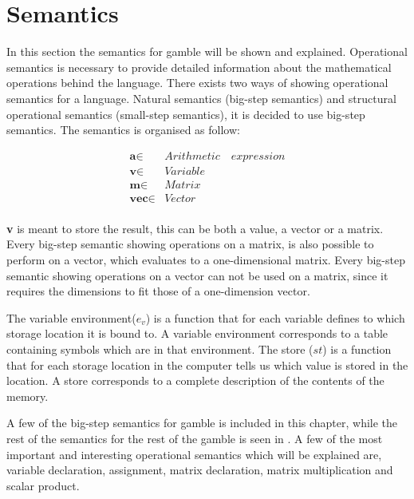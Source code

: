 \chapter{Semantics}
In this section the semantics for \gls{gamble} will be shown and explained.
Operational semantics is necessary to provide detailed information about the mathematical operations behind the language.
There exists two ways of showing operational semantics for a language.
Natural semantics (big-step semantics) and structural operational semantics (small-step semantics), it is decided to use big-step semantics.
The semantics is organised as follow:

\begin{align*}
	\textbf{a} \in  &Arithmetic\quad expression\\
	\textbf{v} \in  &Variable\\
	\textbf{m} \in  &Matrix\\
	\textbf{vec} \in  &Vector\\
\end{align*}

\textbf{v} is meant to store the result, this can be both a value, a vector or a matrix.
Every big-step semantic showing operations on a matrix, is also possible to perform on a vector, which evaluates to a one-dimensional matrix.
Every big-step semantic showing operations on a vector can not be used on a matrix, since it requires the dimensions to fit those of a one-dimension vector.

The variable environment(${ e }_{ v }$) is a function that for each variable defines to which storage location it is bound to. A variable environment corresponds to a table containing symbols which are in that environment.
The store ($st$) is a function that for each storage location in the computer tells us which value is stored in the location. A store corresponds to a complete description of the contents of the memory.\citep{EnvSt_Semantics}

A few of the big-step semantics for \gls{gamble} is included in this chapter, while the rest of the semantics for the rest of the \gls{gamble} is seen in .
A few of the most important and interesting operational semantics which will be explained are, variable declaration, assignment, matrix declaration, matrix multiplication and scalar product.

